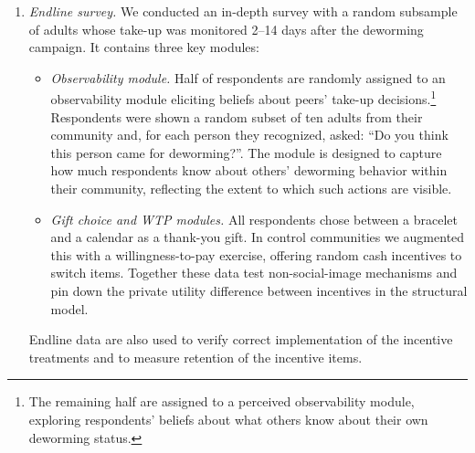 \documentclass[12pt,a4paper]{article}
\begin{document}
\begin{enumerate}




 

  \item \emph{Endline survey.} We conducted an in-depth survey with a random subsample of adults whose take-up was monitored 2–14 days after the deworming campaign. It contains three key modules:
  \begin{itemize} 
      \item \emph{Observability module.} Half of respondents are
  randomly assigned to an observability module eliciting beliefs
  about peers' take-up decisions.\footnote{The remaining half are assigned to a perceived observability module, exploring respondents' beliefs about what others know about their own deworming status.} Respondents were shown a random subset of ten adults from their community and, for each person they recognized, asked: ``Do you think this person came for deworming?''. The module is designed to capture how much respondents know about others’ deworming behavior within their community, reflecting the extent to which such actions are visible.
        
      \item \emph{Gift choice and WTP modules.} All respondents
  chose between a bracelet and a calendar as a thank-you gift. In
  control communities we augmented this with a willingness-to-pay exercise, offering random cash incentives to switch items. Together these data test non-social-image mechanisms and pin down the private utility difference between incentives in the structural model.                                        
  \end{itemize}
  Endline data are also used to verify correct implementation of
  the incentive treatments and to measure retention of the
  incentive items.    

\end{enumerate}
\end{document}
